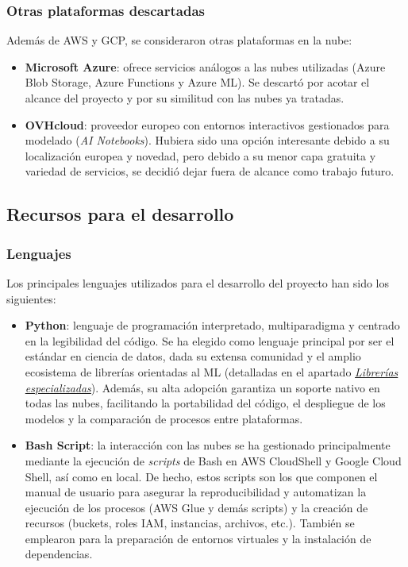 \subsubsection{Otras plataformas descartadas}

Además de AWS y GCP, se consideraron otras plataformas en la nube:
\begin{itemize}
	\item \textbf{Microsoft Azure}: ofrece servicios análogos a las nubes utilizadas (Azure Blob Storage, Azure Functions y Azure ML). Se descartó por acotar el alcance del proyecto y por su similitud con las nubes ya tratadas.
	\item \textbf{OVHcloud}: proveedor europeo con entornos interactivos gestionados para modelado (\textit{AI Notebooks}). Hubiera sido una opción interesante debido a su localización europea y novedad, pero debido a su menor capa gratuita y variedad de servicios, se decidió dejar fuera de alcance como trabajo futuro.
\end{itemize}

\subsection{Recursos para el desarrollo}

\subsubsection{Lenguajes}

Los principales lenguajes utilizados para el desarrollo del proyecto han sido los siguientes:

\begin{itemize}
	\item \textbf{Python}: lenguaje de programación interpretado, multiparadigma y centrado en la legibilidad del código. Se ha elegido como lenguaje principal por ser el estándar en ciencia de datos, dada su extensa comunidad y el amplio ecosistema de librerías orientadas al ML (detalladas en el apartado \hyperref[sec:Librerias_especializadas]{\textit{Librerías especializadas}}). Además, su alta adopción garantiza un soporte nativo en todas las nubes, facilitando la portabilidad del código, el despliegue de los modelos y la comparación de procesos entre plataformas.
	\item \textbf{Bash Script}: la interacción con las nubes se ha gestionado principalmente mediante la ejecución de \textit{scripts} de Bash en AWS CloudShell y Google Cloud Shell, así como en local. De hecho, estos scripts son los que componen el manual de usuario para asegurar la reproducibilidad y automatizan la ejecución de los procesos (AWS Glue y demás scripts) y la creación de recursos (buckets, roles IAM, instancias, archivos, etc.). También se emplearon para la preparación de entornos virtuales y la instalación de dependencias.
\end{itemize}

